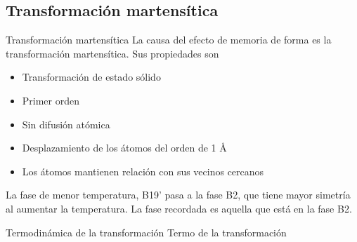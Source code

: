 \documentclass[11pt]{beamer}
\begin{document}
	\subsection{Transformación martensítica}
		\begin{frame}{Transformación martensítica}
			La causa del efecto de memoria de forma es la transformación martensítica.
			Sus propiedades son
			\begin{itemize}
				\item Transformación de estado sólido
				\item Primer orden
				\item Sin difusión atómica
				\item Desplazamiento de los átomos del orden de 1 \AA
				\item Los átomos mantienen relación con sus vecinos cercanos
			\end{itemize}
		\end{frame}
		
		\begin{frame}
			La fase de menor temperatura, B19' pasa a la fase B2, que tiene mayor simetría al aumentar la temperatura. La fase recordada es aquella que está en la fase B2.
			\begin{figure}[H]
			\end{figure}
		\end{frame}
		\begin{frame}{Termodinámica de la transformación}
			Termo de la transformación
		\end{frame}
\end{document}
